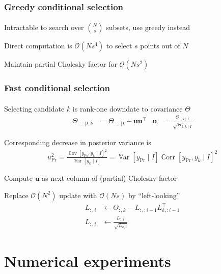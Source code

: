 \documentclass{beamer}                             %
\newcommand*{\BigO}{\mathcal{O}}
\newcommand*{\I}{I}
\renewcommand*{\vec}[1]{\bm{#1}}
\newcommand*{\CM}{\Theta}
\newcommand*{\Pred}{\text{Pr}}
\DeclareMathOperator{\Var}{\mathbb{V}ar}
\DeclareMathOperator{\Cov}{\mathbb{C}ov}
\DeclareMathOperator{\Corr}{\mathbb{C}orr}
\newenvironment{wideitemize}
  {\itemize\setlength{\itemsep}{0.5cm}}
  {\enditemize}
\begin{document}
\begin{frame}
\frametitle{Greedy conditional selection}
\framesubtitle{}

\begin{wideitemize}
  \item<+-> Intractable to search over \(
    \binom{N}{s} \) subsets, use greedy instead
  \item<+-> Direct computation is \( \BigO(N s^4)
    \) to select \( s \) points out of \( N \)
  \item<+-> Maintain partial Cholesky factor for \( \BigO(N s^2) \)
\end{wideitemize}
\end{frame}

\begin{frame}
\frametitle{Fast conditional selection}
\framesubtitle{}

\begin{wideitemize}
  \item<+-> Selecting candidate \( k \) is
    rank-one downdate to covariance \( \CM \)
    \begin{align*}
      \CM_{:, : \mid \I, k} &= \CM_{:, : \mid \I} - \vec{u} \vec{u}^{\top} &
        \vec{u} &= \frac{\CM_{:, k \mid \I}}{\sqrt{\CM_{k, k \mid \I}}}
    \end{align*}
    \vspace{-1\baselineskip}
  \item<+-> Corresponding decrease in posterior variance is
    \begin{align*}
      u_\Pred^2
      = \frac{\Cov[y_\Pred, y_k \mid \I]^2}{\Var[y_k \mid \I]}
      = \Var[y_\Pred \mid \I] \Corr[y_\Pred, y_k \mid \I]^2
    \end{align*}
  \item<+-> Compute \( \vec{u} \) as next column of (partial) Cholesky factor
  \item<+-> Replace \( \BigO(N^2) \) update
    with \( \BigO(N s) \) by ``left-looking''
    \begin{align*}
      L_{:, i} &\gets \CM_{:, k} - L_{:, :i - 1} L_{k, :i - 1}^{\top} \\
      L_{:, i} &\gets \frac{L_{:, i}}{\sqrt{L_{k, i}}}
    \end{align*}
\end{wideitemize}
\end{frame}

\section{Numerical experiments}
\end{document}

